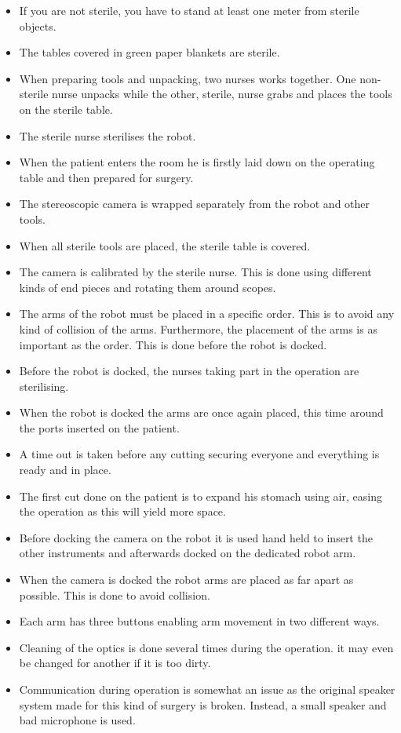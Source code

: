 \documentclass[paper=a4, fontsize=11pt]{scrartcl} %
\numberwithin{equation}{section} %
\numberwithin{figure}{section} %
\numberwithin{table}{section} %
\begin{document}
\begin{itemize}
	\item If you are not sterile, you have to stand at least one meter from sterile objects.
	\item The tables covered in green paper blankets are sterile.
	\item When preparing tools and unpacking, two nurses works together. One non-sterile nurse unpacks while the other, sterile, nurse grabs and places the tools on the sterile table.
	\item The sterile nurse sterilises the robot.
	\item When the patient enters the room he is firstly laid down on the operating table and then prepared for surgery.
	\item The stereoscopic camera is wrapped separately from the robot and other tools.
	\item When all sterile tools are placed, the sterile table is covered.
	\item The camera is calibrated by the sterile nurse. This is done using different kinds of end pieces and rotating them around scopes.
	\item The arms of the robot must be placed in a specific order. This is to avoid any kind of collision of the arms. Furthermore, the placement of the arms is as important as the order. This is done before the robot is docked.
	\item  Before the robot is docked, the nurses taking part in the operation are sterilising.
	\item When the robot is docked the arms are once again placed, this time around the ports inserted on the patient.
	\item A time out is taken before any cutting securing everyone and everything is ready and in place.
	\item The first cut done on the patient is to expand his stomach using air, easing the operation as this will yield more space.
	\item Before docking the camera on the robot it is used hand held to insert the other instruments and afterwards docked on the dedicated robot arm.
	\item When the camera is docked the robot arms are placed as far apart as possible. This is done to avoid collision.
	\item Each arm has three buttons enabling arm movement in two different ways.
	\item Cleaning of the optics is done several times during the operation. it may even be changed for another if it is too dirty.
	\item Communication during operation is somewhat an issue as the original speaker system made for this kind of surgery is broken. Instead, a small speaker and bad microphone is used.
\end{itemize}
\end{document}
